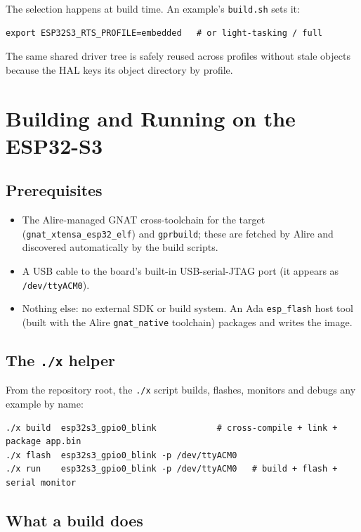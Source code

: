 The selection happens at build time. An example's \texttt{build.sh} sets it:

\begin{lstlisting}[style=sh]
export ESP32S3_RTS_PROFILE=embedded   # or light-tasking / full
\end{lstlisting}

The same shared driver tree is safely reused across profiles without stale
objects because the HAL keys its object directory by profile.

\chapter{Building and Running on the ESP32-S3}
\label{ch:build}

\section{Prerequisites}

\begin{itemize}
\item The Alire-managed GNAT cross-toolchain for the target
  (\texttt{gnat\_xtensa\_esp32\_elf}) and \texttt{gprbuild}; these are fetched by
  Alire and discovered automatically by the build scripts.
\item A USB cable to the board's built-in USB-serial-JTAG port (it appears as
  \texttt{/dev/ttyACM0}).
\item Nothing else: no external SDK or build system. An Ada \texttt{esp\_flash}
  host tool (built with the Alire \texttt{gnat\_native} toolchain) packages and
  writes the image.
\end{itemize}

\section{The \texttt{./x} helper}

From the repository root, the \texttt{./x} script builds, flashes, monitors and
debugs any example by name:

\begin{lstlisting}[style=sh]
./x build  esp32s3_gpio0_blink            # cross-compile + link + package app.bin
./x flash  esp32s3_gpio0_blink -p /dev/ttyACM0
./x run    esp32s3_gpio0_blink -p /dev/ttyACM0   # build + flash + serial monitor
\end{lstlisting}

\section{What a build does}

